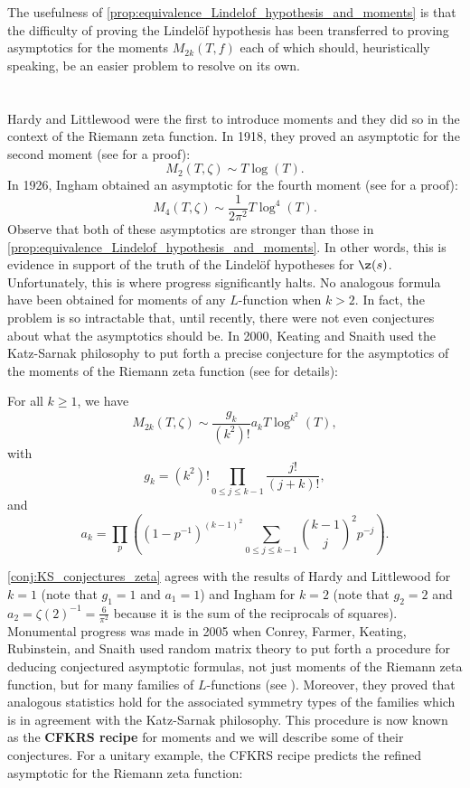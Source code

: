   The usefulness of \cref{prop:equivalence_Lindelof_hypothesis_and_moments} is that the difficulty of proving the Lindel\"of hypothesis has been transferred to proving asymptotics for the moments $M_{2k}(T,f)$ each of which should, heuristically speaking, be an easier problem to resolve on its own.
\section{}
  Hardy and Littlewood were the first to introduce moments and they did so in the context of the Riemann zeta function. In 1918, they proved an asymptotic for the second moment (see \cite{hardy1916contributions} for a proof):
  \[
    M_{2}(T,\zeta) \sim T\log(T).
  \]
  In 1926, Ingham obtained an asymptotic for the fourth moment (see \cite{ingham1928mean} for a proof):
  \[
    M_{4}(T,\zeta) \sim \frac{1}{2\pi^{2}}T\log^{4}(T).
  \]
  Observe that both of these asymptotics are stronger than those in \cref{prop:equivalence_Lindelof_hypothesis_and_moments}. In other words, this is evidence in support of the truth of the Lindel\"of hypotheses for $\z(s)$. Unfortunately, this is where progress significantly halts. No analogous formula have been obtained for moments of any $L$-function when $k > 2$. In fact, the problem is so intractable that, until recently, there were not even conjectures about what the asymptotics should be. In 2000, Keating and Snaith used the Katz-Sarnak philosophy to put forth a precise conjecture for the asymptotics of the moments of the Riemann zeta function (see \cite{keating2000random} for details):

  \begin{conjecture}\label{conj:KS_conjectures_zeta}
    For all $k \ge 1$, we have
    \[
      M_{2k}(T,\zeta) \sim \frac{g_{k}}{(k^{2})!}a_{k}T\log^{k^{2}}(T),
    \]
    with
    \[
      g_{k} = (k^{2})!\prod_{0 \le j \le k-1}\frac{j!}{(j+k)!},
    \]
    and
    \[
      a_{k} = \prod_{p}\left((1-p^{-1})^{(k-1)^{2}}\sum_{0 \le j \le k-1}\binom{k-1}{j}^{2}p^{-j}\right).
    \]
  \end{conjecture}
  
  \cref{conj:KS_conjectures_zeta} agrees with the results of Hardy and Littlewood for $k = 1$ (note that $g_{1} = 1$ and $a_{1} = 1$) and Ingham for $k = 2$ (note that $g_{2} = 2$ and $a_{2} = \zeta(2)^{-1} = \frac{6}{\pi^{2}}$ because it is the sum of the reciprocals of squares). Monumental progress was made in 2005 when Conrey, Farmer, Keating, Rubinstein, and Snaith used random matrix theory to put forth a procedure for deducing conjectured asymptotic formulas, not just moments of the Riemann zeta function, but for many families of $L$-functions (see \cite{conrey2005integral}). Moreover, they proved that analogous statistics hold for the associated symmetry types of the families which is in agreement with the Katz-Sarnak philosophy. This procedure is now known as the \textbf{CFKRS recipe} for moments and we will describe some of their conjectures. For a unitary example, the CFKRS recipe predicts the refined asymptotic for the Riemann zeta function:

